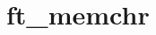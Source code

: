 \chapter{ft\+\_\+memchr}
\hypertarget{md_Documentation_2ft__memchr}{}\label{md_Documentation_2ft__memchr}
